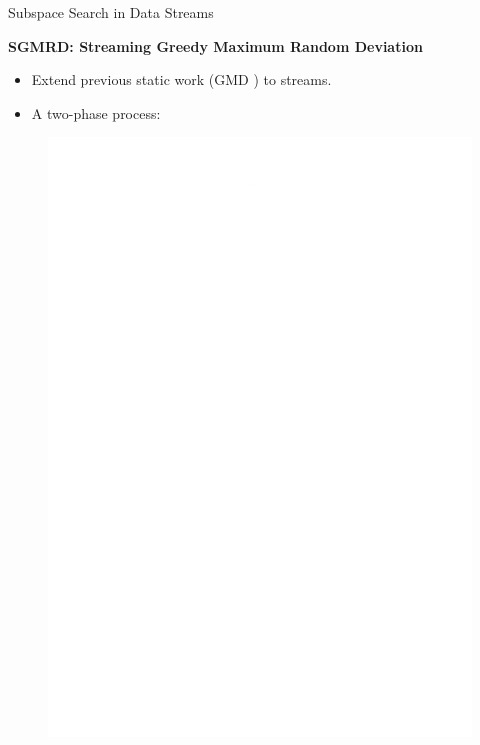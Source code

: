 \documentclass[16pt,usenames,dvipsnames, notheorems]{beamer}
\theoremstyle{definition}
\theoremstyle{example}
\theoremstyle{plain}
\begin{document}
\begin{frame}{Subspace Search in Data Streams}

\textbf{SGMRD: Streaming Greedy Maximum Random Deviation} 
\begin{itemize}
	\item Extend previous static work (GMD \cite{DBLP:journals/ijdsa/TrittenbachB19}) to streams. 
	\item A two-phase process:
\end{itemize}

\begin{figure}
	\begin{overprint}
		\includegraphics[width=0.9\linewidth]{figures/SGMRD_workflow_6-compressed.pdf}
		\onslide<2>

\end{overprint}
\end{figure}
\end{frame}
\end{document}

